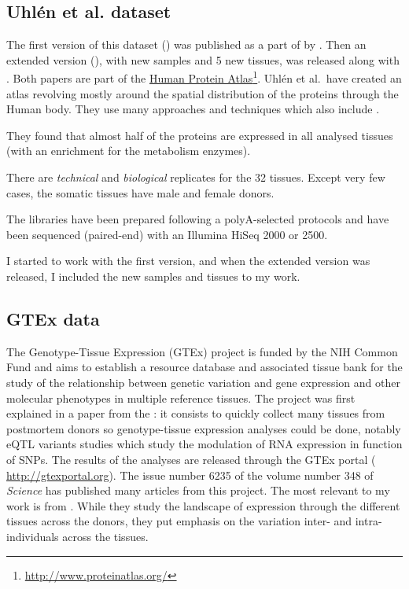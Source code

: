 \subsection{Uhlén et al. dataset}

The first version of this dataset () was published
as a part of  by \citet{Uhlen2014}. Then an extended
version (), with new samples and 5 new tissues,
was released along with  \citep{Uhlen2015}.
Both papers are part of the
\href{http://www.proteinatlas.org/}{Human Protein Atlas}\footnote{
    \href{http://www.proteinatlas.org/}{http://www.proteinatlas.org/}}.
Uhlén et al.\ have created
an atlas revolving mostly around the spatial distribution of the proteins through
the Human body. They use many approaches and techniques which also include \Rnaseq.

They found that almost half of the proteins are expressed in all analysed tissues
(with an enrichment for the metabolism enzymes).

There are \emph{technical} and \emph{biological} replicates for the 32 tissues.
Except very few cases, the somatic tissues have male and female donors.

The libraries have been prepared following a polyA-selected protocols and have
been sequenced (paired-end) with an Illumina HiSeq 2000 or 2500.

I started to work with the first version, and when the extended version was
released, I included the new samples and tissues to my work.

\subsection{GTEx data}

The Genotype-Tissue Expression (\gls{GTEx}) project is funded by the NIH Common
Fund and aims to establish a resource database and associated tissue bank
for the study of the relationship between genetic variation and gene expression
and other molecular phenotypes in multiple reference tissues. The project was first
explained in a paper from the \cite{GTEx2013}: it consists to quickly collect
many tissues from postmortem donors so genotype-tissue expression analyses could
be done, notably \gls{eQTL} variants studies which study the modulation
of \gls{RNA} expression in function of \glspl{SNP}. The results of the
analyses are released through the GTEx portal (%
\href{http://gtexportal.org}{http://gtexportal.org}). The issue number 6235 of
the volume number 348 of \emph{Science} has published
many articles from this project. The most relevant to my work is
 from \cite{GTExTranscript}. While they study
the landscape of expression through the different tissues across the donors, they
put emphasis on the variation inter- and intra-individuals across the tissues.

